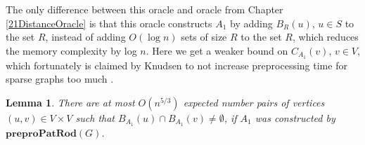 \documentclass[shortabstract, lic, english]{iithesis}
\theoremstyle{definition} \newtheorem{definition}{Definition}[chapter]
\theoremstyle{plain} \newtheorem{remark}[definition]{Observation}
\theoremstyle{plain} \newtheorem{theorem}[definition]{Theorem}
\theoremstyle{plain} \newtheorem{lemma}[definition]{Lemma}
\theoremstyle{plain} \newtheorem{conjecture}[definition]{Conjecture}
\DeclarePairedDelimiter{\ceil}{\lceil}{\rceil}
\begin{document}
\noindent{}

The only difference between this oracle and oracle from Chapter \ref{21DistanceOracle} is that this oracle
constructs $A_1$ by adding $B_R(u)$, $u \in S$ to the set $R$, instead of adding $O(\log n)$ sets of size $R$ to the set $R$, which reduces the memory complexity by log $n$.
Here we get a weaker bound on $C_{A_1}(v)$, $v \in V$, which fortunately is claimed by Knudsen to not increase preprocessing time for sparse graphs too much \cite[Chapter 4, Lemma 10]{21OracleSpannerNoPenaltyNoLog}.

\begin{lemma} \label{patRodBallIntersections}
    There are at most $O(n^{5/3})$ expected number pairs of vertices $(u, v) \in V \times V$
    such that $B_{A_1}(u) \cap B_{A_1}(v) \neq \emptyset$,
    if $A_1$ was constructed by $\mathbf{preproPatRod}(G)$.
\end{lemma}
\end{document}
